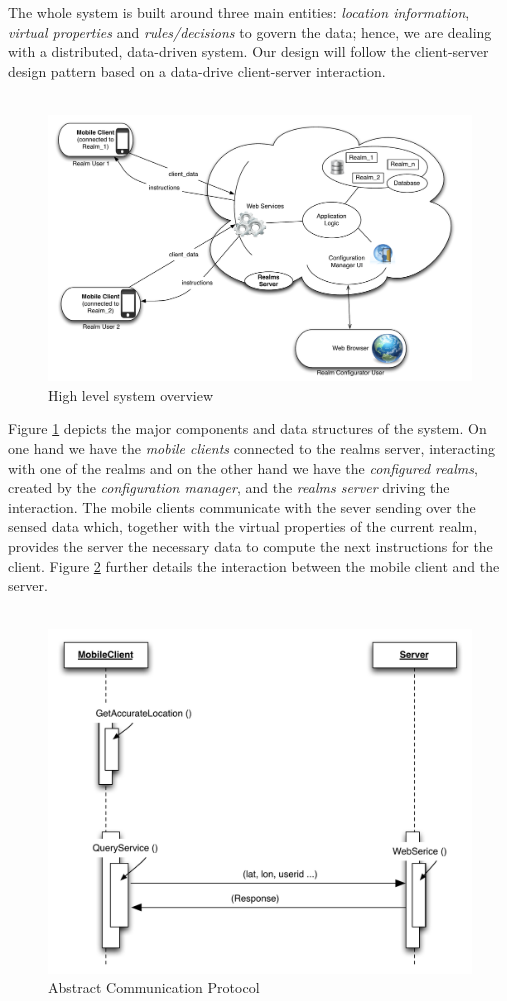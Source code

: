 The whole system is built around three main entities: \emph{location information}, \emph{virtual properties} and \emph{rules/decisions} to govern the data; hence, we are dealing with a distributed, data-driven system. Our design will follow the client-server design pattern based on a data-drive client-server interaction.
\\\\
\begin{figure}
	\centering
	\includegraphics[width=0.9\linewidth]{fig/realms_high_lvl}
	\caption{High level system overview}
	\label{fig.design.high_lvl}
\end{figure}
Figure \ref{fig.design.high_lvl} depicts the major components and data structures of the system. On one hand we have the \emph{mobile clients} connected to the realms server, interacting with one of the realms and on the other hand we have the \emph{configured realms}, created by the \emph{configuration manager}, and the \emph{realms server} driving the interaction. The mobile clients communicate with the sever sending over the sensed data which, together with the virtual properties of the current realm, provides the server the necessary data to compute the next instructions for the client. Figure \ref{fig.design.comm_protocol} further details the interaction between the mobile client and the server.
\\\\
\begin{figure}[H]
	\centering
	\includegraphics[width=0.9\linewidth]{fig/abstract_communication_protocol}
	\caption{Abstract Communication Protocol}
	\label{fig.design.comm_protocol}
\end{figure}
